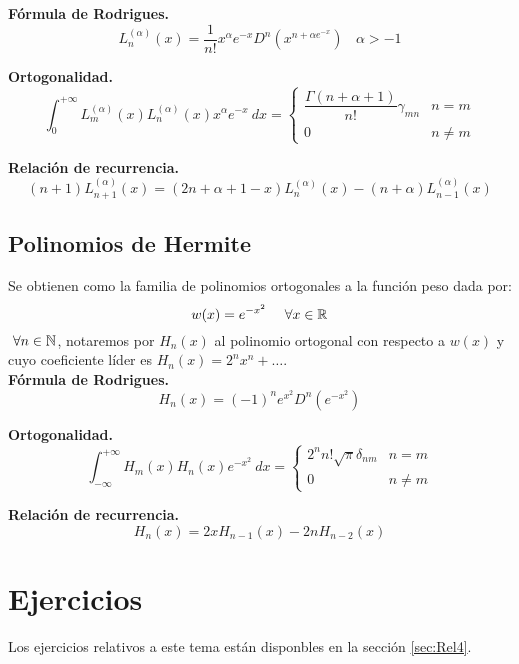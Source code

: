 \noindent
\textbf{Fórmula de Rodrigues.}
$$L_n^{(\alpha)}(x) = \dfrac{1}{n!}x^{\alpha}e^{-x}D^n(x^{n+\alpha e^{-x}})~~~~\alpha >-1$$

\noindent
\textbf{Ortogonalidad.}
$$\int_0^{+\infty}L_m^{(\alpha)}(x) L_n^{(\alpha)}(x) x^\alpha e^{-x}~dx = \left\{ \begin{array}{ll}
        \dfrac{\Gamma(n + \alpha + 1)}{n!}\gamma_{mn} & n = m    \\
        0                                             & n \neq m
    \end{array} \right.$$

\noindent
\textbf{Relación de recurrencia.}
$$(n+1)L_{n+1}^{(\alpha)}(x) = (2n + \alpha + 1 - x)L_n^{(\alpha)}(x) - (n+\alpha)L_{n-1}^{(\alpha)}(x)$$

\subsection{Polinomios de Hermite}
\noindent
Se obtienen como la familia de polinomios ortogonales a la función peso dada por:
$$w(x) = e^{-x^2}~~~~\forall x \in \mathbb R$$
$\ \forall n \in \mathbb N$, notaremos por $H_n(x)$ al polinomio ortogonal con respecto a $w(x)$ y cuyo coeficiente líder es $H_n(x) = 2^nx^n + \ldots$.\\

\noindent
\textbf{Fórmula de Rodrigues.}
$$H_n(x) = (-1)^n e^{x^2} D^n(e^{-x^2})$$

\noindent
\textbf{Ortogonalidad.}
$$\int_{-\infty}^{+\infty}H_m(x) H_n(x) e^{-x^2}~dx = \left\{ \begin{array}{ll}
        2^n n! \sqrt{\pi}\delta_{nm} & n = m    \\
        0                            & n \neq m
    \end{array} \right.$$

\noindent
\textbf{Relación de recurrencia.}
$$H_n(x) = 2xH_{n-1}(x) -2nH_{n-2}(x)$$


\section{Ejercicios}
Los ejercicios relativos a este tema están disponbles en la sección \ref{sec:Rel4}.